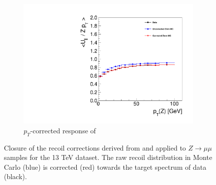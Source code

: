 \begin{figure}
\begin{subfigure}{.50\textwidth}
\includegraphics[width=\linewidth]{plots/Recoil/validation_13/response_par.pdf}
\caption{$p_T$-corrected response of \upar}
\end{subfigure}%
\caption{Closure of the recoil corrections derived from and applied to $Z\rightarrow\mu\mu$ samples for the 13 TeV dataset. The raw recoil distribution in Monte Carlo (blue) is corrected (red) towards the target spectrum of data (black).}
\label{fig:recoil:validation:13}
\end{figure}